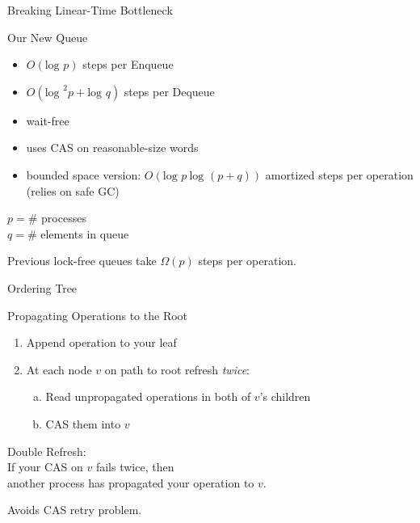 \documentclass[compress]{beamer}
\newcommand{\Red}[1]{{\color{red}#1}}
\newcommand{\op}[1]{\mbox{\sc #1}}
\renewcommand{\log}{\mbox{log }} %
\begin{document}
\begin{frame}{Breaking Linear-Time Bottleneck}

\begin{block}{Our New Queue}
\begin{itemize}
\item $O(\log p)$ steps per \op{Enqueue}
\item $O(\log^2 p + \log q)$ steps per \op{Dequeue}
\item wait-free
\item uses CAS on reasonable-size words
\item bounded space version: $O(\log p\ \log(p+q))$ amortized steps per operation
(relies on safe GC)
\end{itemize}
\end{block}

$p = \#$ processes\\
$q = \#$ elements in queue

\medskip

Previous lock-free queues take $\Omega(p)$ steps per operation.

\end{frame}

\begin{frame}{Ordering Tree}

\hspace*{-7mm}
\only<2>{}%
\only<3>{}%

\end{frame}

\begin{frame}{Propagating Operations to the Root}

\begin{enumerate}
\item
Append operation to your leaf
\item
At each node $v$ on path to root refresh {\it twice}:
\begin{enumerate}[(a)]
\item
Read unpropagated operations in both of $v$'s children
\item
CAS them into $v$
\end{enumerate}
\end{enumerate}

\pause
\medskip

\Red{Double Refresh}:\\
If your CAS on $v$ fails twice, then\\
another process has propagated your operation to $v$.

\pause
\medskip
Avoids CAS retry problem.
\end{frame}
\end{document}

